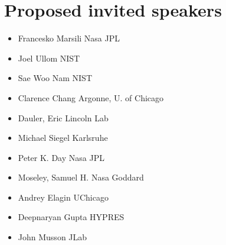 \documentclass{article}
\begin{document}
\section{Proposed invited speakers}
\begin{itemize}
\item Francesko Marsili	Nasa JPL
\item Joel Ullom	NIST
\item Sae Woo Nam	NIST
\item Clarence Chang 	Argonne, U. of Chicago
\item Dauler, Eric	Lincoln Lab
\item Michael Siegel	Karlsruhe
\item Peter K. Day	Nasa JPL
\item Moseley, Samuel H.	Nasa Goddard
\item Andrey Elagin	UChicago
\item Deepnaryan Gupta HYPRES
\item John Musson JLab
\end{itemize}
\end{document}
